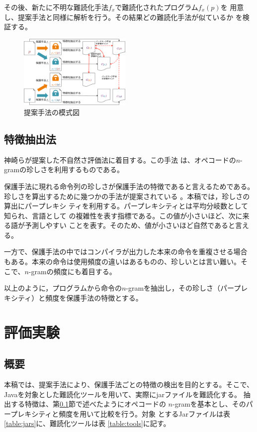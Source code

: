 \documentclass[a4j,fleqn,10pt]{jarticle}
\begin{document}
その後、新たに不明な難読化手法$f_x$で難読化されたプログラム$f_x(p)$を
用意し、提案手法と同様に解析を行う。その結果どの難読化手法が似ているか
を検証する。

\begin{figure}[b]
  \includegraphics[width=0.48\textwidth]{overview}
  \caption{提案手法の模式図}\label{fig:overview}
\end{figure}

\subsection{特徴抽出法}\label{sect:method}

神崎らが提案した不自然さ評価法に着目する\cite{kanzaki14ipsj}。この手法
は、オペコードの$n$-gramの珍しさを利用するものである。

保護手法に現れる命令列の珍しさが保護手法の特徴であると言えるためである。
珍しさを算出するために幾つかの手法が提案されている
\cite{kanzaki14ipsj,gekka14scis}。本稿では，珍しさの算出にパープレキシ
ティを利用する。パープレキシティとは平均分岐数として知られ、言語として
の複雑性を表す指標である。この値が小さいほど、次に来る語が予測しやすい
ことを表す。そのため、値が小さいほど自然であると言える。

一方で、保護手法の中ではコンパイラが出力した本来の命令を重複させる場合
もある。本来の命令は使用頻度の違いはあるものの、珍しいとは言い難い。そ
こで、$n$-gramの頻度にも着目する。

以上のように，プログラムから命令の$n$-gramを抽出し，その珍しさ（パープレ
  キシティ）と頻度を保護手法の特徴とする。

\section{評価実験}\label{sect:experiments}

\subsection{概要}

本稿では、提案手法により、保護手法ごとの特徴の検出を目的とする。そこで、
Javaを対象とした難読化ツールを用いて、実際にjarファイルを難読化する。
抽出する特徴は、第\ref{sect:method}節で述べたようにオペコードの
$n$-gramを基本とし、そのパープレキシティと頻度を用いて比較を行う。対象
とするJarファイルは表\ref{table:jars}に、難読化ツールは表
\ref{table:tools}に記す。
\end{document}
